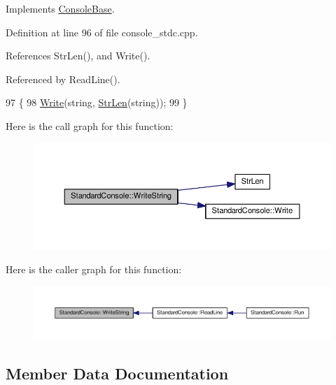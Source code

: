 Implements \hyperlink{classConsoleBase_a839801eeb5c25cd0a2cb13523e387bed}{Console\+Base}.



Definition at line 96 of file console\+\_\+stdc.\+cpp.



References Str\+Len(), and Write().



Referenced by Read\+Line().


\begin{DoxyCode}
97 \{
98     \hyperlink{classStandardConsole_a43844eb181d640c0e4860ef21c2e8fa7}{Write}(\textcolor{keywordtype}{string}, \hyperlink{clib_8h_a67ec56eb98b49515d35005a5b3bf9a32}{StrLen}(\textcolor{keywordtype}{string}));
99 \}
\end{DoxyCode}


Here is the call graph for this function\+:
\nopagebreak
\begin{figure}[H]
\begin{center}
\leavevmode
\includegraphics[width=350pt]{d5/d48/classStandardConsole_a4357667b7d80d110aca730ccb1cdca13_cgraph}
\end{center}
\end{figure}




Here is the caller graph for this function\+:
\nopagebreak
\begin{figure}[H]
\begin{center}
\leavevmode
\includegraphics[width=350pt]{d5/d48/classStandardConsole_a4357667b7d80d110aca730ccb1cdca13_icgraph}
\end{center}
\end{figure}




\subsection{Member Data Documentation}
